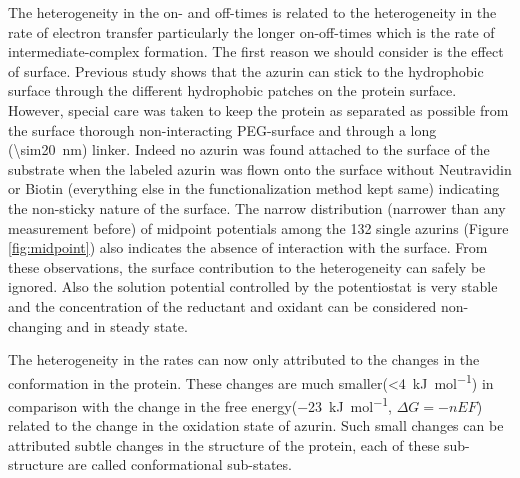 The heterogeneity in the on- and off-times is related to the heterogeneity in the rate of electron transfer particularly the longer on-off-times which is the rate of intermediate-complex formation.
The first reason we should consider is the effect of surface.
Previous study shows that the azurin can stick to the hydrophobic surface through the different hydrophobic patches on the protein surface.\cite{patil2010visualizing,salverda2010fluorescent,akkilic2014chemically-induced}
However, special care was taken to keep the protein as separated as possible from the surface thorough non-interacting PEG-surface and through a long (\SI{\sim20}{\nm}) linker.
Indeed no azurin was found attached to the surface of the substrate when the labeled azurin was flown onto the surface without Neutravidin or Biotin (everything else in the functionalization method kept same) indicating the non-sticky nature of the surface.
The narrow distribution (narrower than any measurement before) of midpoint potentials among the 132 single azurins (Figure \ref{fig:midpoint}) also indicates the absence of interaction with the surface.
From these observations, the surface contribution to the heterogeneity can safely be ignored.
Also the solution potential controlled by the potentiostat is very stable and the concentration of the reductant and oxidant can be considered non-changing and in steady state.

The heterogeneity in the rates can now only attributed to the changes in the conformation in the protein.
These changes are much smaller(\SI{<4}{\kJ\per\mole}) in comparison with the change in the free energy(\SI{-23}{\kJ\per\mole}, $\Delta{G}=-nEF$) related to the change in the oxidation state of azurin.
Such small changes can be attributed subtle changes in the structure of the protein, each of these sub-structure are called conformational sub-states.

